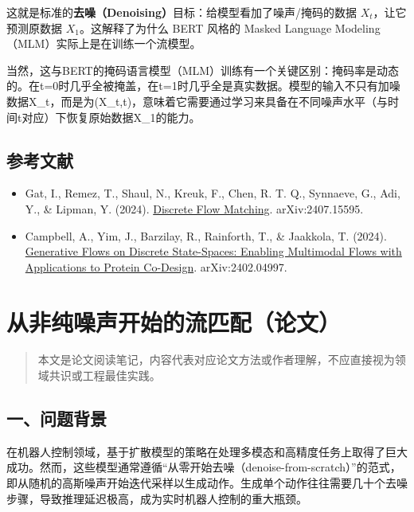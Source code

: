 这就是标准的\textbf{去噪（Denoising）}目标：给模型看加了噪声/掩码的数据 \(X_t\)，让它预测原数据 \(X_1\)。这解释了为什么 BERT 风格的 Masked Language Modeling（MLM）实际上是在训练一个流模型。

当然，这与BERT的掩码语言模型（MLM）训练有一个关键区别：掩码率是动态的。在t=0时几乎全被掩盖，在t=1时几乎全是真实数据。模型的输入不只有加噪数据X\_t，而是为(X\_t,t)，意味着它需要通过学习来具备在不同噪声水平（与时间t对应）下恢复原始数据X\_1的能力。

\hypertarget{ux53c2ux8003ux6587ux732e-161}{%
\subsection{参考文献}\label{ux53c2ux8003ux6587ux732e-161}}

\begin{itemize}
\tightlist
\item
  Gat, I., Remez, T., Shaul, N., Kreuk, F., Chen, R. T. Q., Synnaeve, G., Adi, Y., \& Lipman, Y. (2024). \href{https://arxiv.org/abs/2407.15595}{Discrete Flow Matching}. arXiv:2407.15595.
\item
  Campbell, A., Yim, J., Barzilay, R., Rainforth, T., \& Jaakkola, T. (2024). \href{https://arxiv.org/abs/2402.04997}{Generative Flows on Discrete State-Spaces: Enabling Multimodal Flows with Applications to Protein Co-Design}. arXiv:2402.04997.
\end{itemize}

\clearpage

\hypertarget{ux4eceux975eux7eafux566aux58f0ux5f00ux59cbux7684ux6d41ux5339ux914dux8bbaux6587}{%
\section{从非纯噪声开始的流匹配（论文）}\label{ux4eceux975eux7eafux566aux58f0ux5f00ux59cbux7684ux6d41ux5339ux914dux8bbaux6587}}

\begin{quote}
本文是论文阅读笔记，内容代表对应论文方法或作者理解，不应直接视为领域共识或工程最佳实践。
\end{quote}

\hypertarget{ux4e00ux95eeux9898ux80ccux666f-4}{%
\subsection{一、问题背景}\label{ux4e00ux95eeux9898ux80ccux666f-4}}

在机器人控制领域，基于扩散模型的策略在处理多模态和高精度任务上取得了巨大成功。然而，这些模型通常遵循``从零开始去噪（denoise-from-scratch）''的范式，即从随机的高斯噪声开始迭代采样以生成动作。生成单个动作往往需要几十个去噪步骤，导致推理延迟极高，成为实时机器人控制的重大瓶颈。

